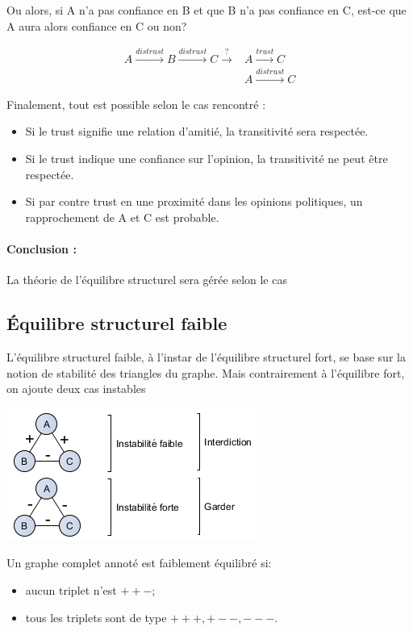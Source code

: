 Ou alors, si A n'a pas confiance en B et que B n'a pas confiance en C, est-ce que A aura alors confiance en C ou non?


\begin{align*}
A \overset{distrust}{\longrightarrow} B \overset{distrust}{\longrightarrow} C \overset{?}{\longrightarrow} &A \overset{trust}{\longrightarrow} C\\
&A \overset{distrust}{\longrightarrow} C
\end{align*}

Finalement, tout est possible selon le cas rencontré : 
\begin{itemize}
\item Si le trust signifie une relation d'amitié, la transitivité sera respectée. 
\item Si le trust indique une confiance sur l’opinion, la transitivité ne peut être respectée. 
\item Si par contre trust en une proximité dans les opinions politiques, un rapprochement de A et C est probable. 
\end{itemize}


\paragraph{Conclusion :}La théorie de l'équilibre structurel sera gérée selon le cas




\subsection{Équilibre structurel faible}
L'équilibre structurel faible, à l'instar de l'équilibre structurel fort, se base sur la
notion de stabilité des triangles du graphe. Mais contrairement à l'équilibre fort, on ajoute deux cas instables   

\includegraphics[scale=1]{images/22_Instabilite.png}

Un graphe complet annoté est faiblement équilibré si:
\begin{itemize}
\item aucun triplet n'est $++-$;
\item tous les triplets sont de type $+++, +--, ---$. 
\end{itemize}
